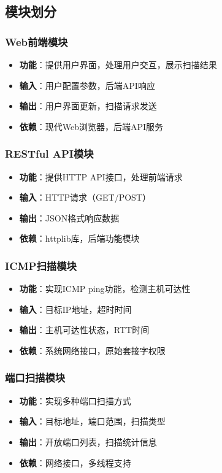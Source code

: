 \documentclass[12pt,hyperref,a4paper,UTF8]{ctexart}
\begin{document}
\subsection{模块划分}

\subsubsection{Web前端模块}
\begin{itemize}
    \item \textbf{功能}：提供用户界面，处理用户交互，展示扫描结果
    \item \textbf{输入}：用户配置参数，后端API响应
    \item \textbf{输出}：用户界面更新，扫描请求发送
    \item \textbf{依赖}：现代Web浏览器，后端API服务
\end{itemize}

\subsubsection{RESTful API模块}
\begin{itemize}
    \item \textbf{功能}：提供HTTP API接口，处理前端请求
    \item \textbf{输入}：HTTP请求（GET/POST）
    \item \textbf{输出}：JSON格式响应数据
    \item \textbf{依赖}：httplib库，后端功能模块
\end{itemize}

\subsubsection{ICMP扫描模块}
\begin{itemize}
    \item \textbf{功能}：实现ICMP ping功能，检测主机可达性
    \item \textbf{输入}：目标IP地址，超时时间
    \item \textbf{输出}：主机可达性状态，RTT时间
    \item \textbf{依赖}：系统网络接口，原始套接字权限
\end{itemize}

\subsubsection{端口扫描模块}
\begin{itemize}
    \item \textbf{功能}：实现多种端口扫描方式
    \item \textbf{输入}：目标地址，端口范围，扫描类型
    \item \textbf{输出}：开放端口列表，扫描统计信息
    \item \textbf{依赖}：网络接口，多线程支持
\end{itemize}
\end{document}
